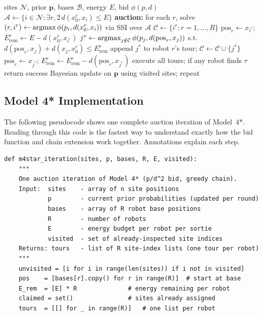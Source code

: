 \begin{doublespacing}
\begin{algorithm}[ht]
\caption{Model 4 / 4* iteration.}\label{alg:m4}
\begin{algorithmic}[1]
\Require sites $\mathcal{N}$, prior $\mathbf{p}$, bases $\mathcal{B}$, energy $E$, bid $\phi(p, d)$
\State $\mathcal{A} \gets \{i \in \mathcal{N} : \exists r, 2\,d(x_0^r, x_i) \leq E\}$
\State \textbf{auction:} for each $r$, solve $(r, i^r) \gets \argmax \phi(p_i, d(x_0^r, x_i))$ via SSI over $\mathcal{A}$
\State $\mathcal{C} \gets \{i^r : r = 1,\ldots,R\}$
  \State $\mathrm{pos}_r \gets x_{i^r}$; $E^r_{\mathrm{rem}} \gets E - d(x_0^r, x_{i^r})$
\EndFor
{}
    \State $j^* \gets \argmax_{j \notin \mathcal{C}} \phi(p_j, d(\mathrm{pos}_r, x_j))$ s.t.\ $d(\mathrm{pos}_r, x_j) + d(x_j, x_0^r) \leq E^r_{\mathrm{rem}}$
      \State append $j^*$ to robot $r$'s tour; $\mathcal{C} \gets \mathcal{C} \cup \{j^*\}$
      \State $\mathrm{pos}_r \gets x_{j^*}$; $E^r_{\mathrm{rem}} \gets E^r_{\mathrm{rem}} - d(\mathrm{pos}_r, x_{j^*})$
    \EndIf
  \EndFor
\EndWhile
\State execute all tours; if any robot finds $\tau$ return success
\State Bayesian update on $\mathbf{p}$ using visited sites; repeat
\end{algorithmic}
\end{algorithm}

\subsection{Model 4* Implementation}

The following pseudocode shows one complete auction iteration of Model~4*.
Reading through this code is the fastest way to understand exactly how the
bid function and chain extension work together. Annotations explain each
step.

{\small\begin{verbatim}
def m4star_iteration(sites, p, bases, R, E, visited):
    """
    One auction iteration of Model 4* (p/d^2 bid, greedy chain).
    Input:  sites    - array of n site positions
            p        - current prior probabilities (updated per round)
            bases    - array of R robot base positions
            R        - number of robots
            E        - energy budget per robot per sortie
            visited  - set of already-inspected site indices
    Returns: tours   - list of R site-index lists (one tour per robot)
    """
    unvisited = [i for i in range(len(sites)) if i not in visited]
    pos    = [bases[r].copy() for r in range(R)]  # start at base
    E_rem  = [E] * R              # energy remaining per robot
    claimed = set()               # sites already assigned
    tours  = [[] for _ in range(R)]   # one list per robot


\end{verbatim}}
\end{doublespacing}
